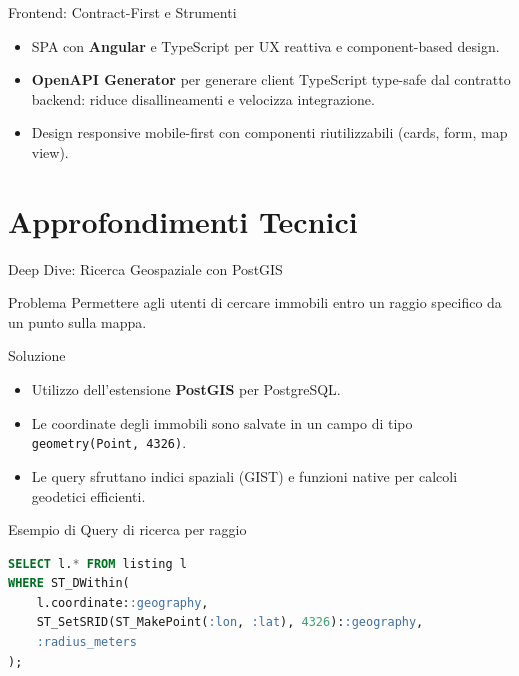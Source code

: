 \documentclass[10pt]{beamer}
\begin{document}
\begin{frame}{Frontend: Contract-First e Strumenti}
    \begin{itemize}
        \item SPA con \textbf{Angular} e TypeScript per UX reattiva e component-based design.
        \item \textbf{OpenAPI Generator} per generare client TypeScript type-safe dal contratto backend: riduce disallineamenti e velocizza integrazione.
        \item Design responsive mobile-first con componenti riutilizzabili (cards, form, map view).
    \end{itemize}
\end{frame}

\section{Approfondimenti Tecnici}

\begin{frame}[fragile]{Deep Dive: Ricerca Geospaziale con PostGIS}
    \begin{block}{Problema}
        Permettere agli utenti di cercare immobili entro un raggio specifico da un punto sulla mappa.
    \end{block}
    \begin{block}{Soluzione}
        \begin{itemize}
            \item Utilizzo dell'estensione \textbf{PostGIS} per PostgreSQL.
            \item Le coordinate degli immobili sono salvate in un campo di tipo \texttt{geometry(Point, 4326)}.
            \item Le query sfruttano indici spaziali (GIST) e funzioni native per calcoli geodetici efficienti.
        \end{itemize}
    \end{block}
    \begin{exampleblock}{Esempio di Query di ricerca per raggio}
\begin{lstlisting}[language=SQL]
SELECT l.* FROM listing l
WHERE ST_DWithin(
    l.coordinate::geography,
    ST_SetSRID(ST_MakePoint(:lon, :lat), 4326)::geography,
    :radius_meters
);
\end{lstlisting}
    \end{exampleblock}
\end{frame}
\end{document}
